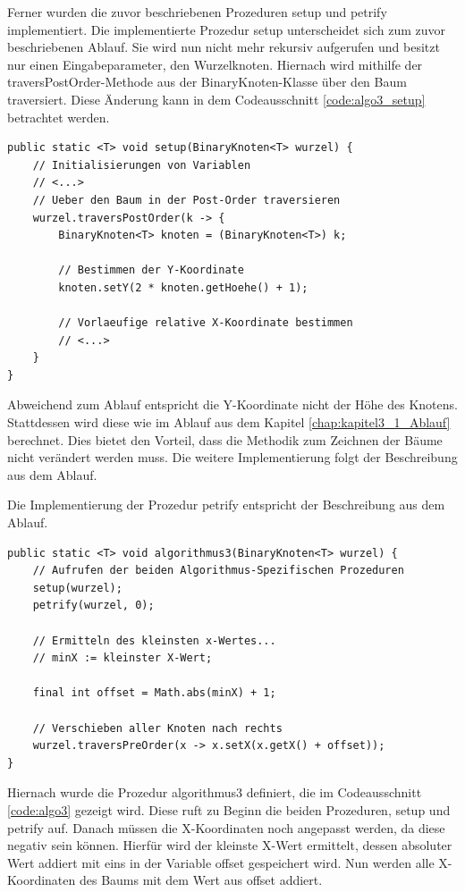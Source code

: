 Ferner wurden die zuvor beschriebenen Prozeduren \glqq setup\grqq{} und \glqq petrify\grqq{} implementiert. Die implementierte Prozedur
\glqq setup\grqq{} unterscheidet sich zum zuvor beschriebenen Ablauf. Sie wird nun nicht mehr rekursiv aufgerufen und besitzt 
nur einen Eingabeparameter, den Wurzelknoten. Hiernach wird mithilfe der \glqq traversPostOrder\grqq{}-Methode aus der 
BinaryKnoten-Klasse über den Baum traversiert. Diese Änderung kann in dem Codeausschnitt \ref{code:algo3_setup} betrachtet werden.

\begin{lstlisting}[caption=Ausschnitt aus der setup-Prozedur, label=code:algo3_setup]
public static <T> void setup(BinaryKnoten<T> wurzel) {
    // Initialisierungen von Variablen
    // <...>
    // Ueber den Baum in der Post-Order traversieren
    wurzel.traversPostOrder(k -> {
        BinaryKnoten<T> knoten = (BinaryKnoten<T>) k;

        // Bestimmen der Y-Koordinate
        knoten.setY(2 * knoten.getHoehe() + 1);

        // Vorlaeufige relative X-Koordinate bestimmen
        // <...>
    }
}
\end{lstlisting}

Abweichend zum Ablauf entspricht die Y-Koordinate nicht der Höhe des Knotens. Stattdessen wird diese wie im 
Ablauf aus dem Kapitel \ref{chap:kapitel3_1_Ablauf} berechnet. Dies bietet den Vorteil, 
dass die Methodik zum Zeichnen der Bäume nicht verändert werden muss. Die weitere Implementierung folgt 
der Beschreibung aus dem Ablauf.

Die Implementierung der Prozedur \glqq petrify\grqq{} entspricht der Beschreibung aus dem Ablauf.

\begin{lstlisting}[caption=Ausschnitt aus der algorithmus3-Prozedur, label=code:algo3]
public static <T> void algorithmus3(BinaryKnoten<T> wurzel) {
    // Aufrufen der beiden Algorithmus-Spezifischen Prozeduren
    setup(wurzel);
    petrify(wurzel, 0);

    // Ermitteln des kleinsten x-Wertes...
    // minX := kleinster X-Wert;

    final int offset = Math.abs(minX) + 1;

    // Verschieben aller Knoten nach rechts
    wurzel.traversPreOrder(x -> x.setX(x.getX() + offset));
}
\end{lstlisting}

Hiernach wurde die Prozedur \glqq algorithmus3\grqq{} definiert, die im Codeausschnitt \ref{code:algo3} gezeigt wird.
Diese ruft zu Beginn die beiden Prozeduren, 
\glqq setup\grqq{} und \glqq petrify\grqq{} auf. Danach müssen die X-Koordinaten noch angepasst werden, da diese 
negativ sein können. Hierfür wird der kleinste X-Wert ermittelt, dessen absoluter Wert 
addiert mit eins in der Variable \glqq offset\grqq{} gespeichert wird. Nun werden alle X-Koordinaten des 
Baums mit dem Wert aus \glqq offset\grqq{} addiert. 

